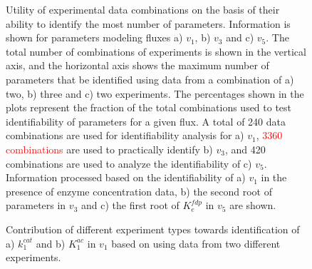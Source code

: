 \documentclass[10pt]{article}
\begin{document}
	\begin{figure}[!tbhp]
		\caption{Utility of experimental data combinations on the basis of their ability to identify the most number of parameters. Information is shown for parameters modeling fluxes a) $v_1$, b) $v_3$ and c) $v_5$. The total number of combinations of experiments is shown in the vertical axis, and the horizontal axis shows the maximum number of parameters that be identified using data from a combination of a) two, b) three and c) two experiments. The percentages shown in the plots represent the fraction of the total combinations used to test identifiability of parameters for a given flux. A total of 240 data combinations are used for identifiability analysis for a) $v_1$, \textcolor{red}{3360 combinations} are used to practically identify b) $v_3$, and 420 combinations are used to analyze the identifiability of c) $v_5$. Information processed based on the identifiability of a) $v_1$ in the presence of enzyme concentration data, b) the second root of parameters in $v_3$ and c) the first root of $K_e^{fdp}$ in $v_5$ are shown.}\label{fig:other_data_utility}
	\end{figure}		

	\begin{figure}[!tbhp]
		\caption{Contribution of different experiment types towards identification of a) $k_1^{cat}$ and b) $K_1^{ac}$ in $v_1$ based on using data from two different experiments.}%
	\end{figure} 	
\end{document}
